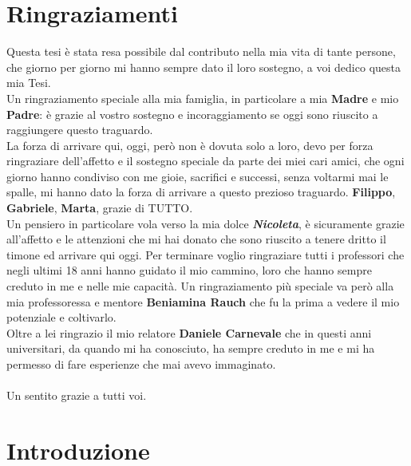 \chapter*{Ringraziamenti} 
Questa tesi è stata resa possibile dal contributo nella mia vita di tante persone, che giorno per giorno mi hanno sempre dato il loro sostegno, a voi dedico questa mia Tesi.\\
Un ringraziamento speciale alla mia famiglia, in particolare a mia \textbf{Madre} e mio \textbf{Padre}: è grazie al vostro sostegno e incoraggiamento se oggi sono riuscito a raggiungere questo traguardo.\\
La forza di arrivare qui, oggi, però non è dovuta solo a loro, devo per forza ringraziare dell'affetto e il sostegno speciale da parte dei miei cari amici, che ogni giorno hanno condiviso con me gioie, sacrifici e successi, senza voltarmi mai le spalle, mi hanno dato la forza di arrivare a questo prezioso traguardo.
\textbf{Filippo}, \textbf{Gabriele}, \textbf{Marta}, grazie di TUTTO.\\
Un pensiero in particolare vola verso la mia dolce \textbf{\textit{Nicoleta}}, è sicuramente grazie all'affetto e le attenzioni che mi hai donato che sono riuscito a tenere dritto il timone ed arrivare qui oggi.
Per terminare voglio ringraziare tutti i professori che negli ultimi 18 anni hanno guidato il mio cammino, loro che hanno sempre creduto in me e nelle mie capacità. Un ringraziamento più speciale va però alla mia professoressa e mentore \textbf{Beniamina Rauch} che fu la prima a vedere il mio potenziale e coltivarlo.\\
Oltre a lei ringrazio il mio relatore \textbf{Daniele Carnevale} che in questi anni universitari, da quando mi ha conosciuto, ha sempre creduto in me e mi ha permesso di fare esperienze che mai avevo immaginato.\\ \\
Un sentito grazie a tutti voi.\\

\chapter*{Introduzione}

